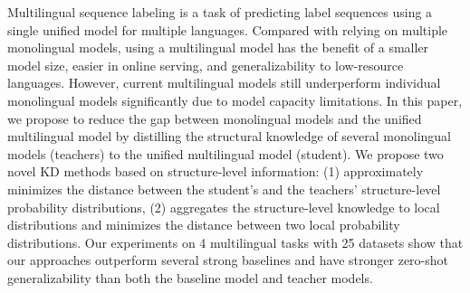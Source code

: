 Multilingual sequence labeling is a task of predicting label sequences using a single unified model for multiple languages. Compared with relying on multiple monolingual models, using a multilingual model has the benefit of a smaller model size, easier in online serving, and generalizability to low-resource languages. However, current multilingual models still underperform individual monolingual models significantly due to model capacity limitations. In this paper, we propose to reduce the gap between monolingual models and the unified multilingual model by distilling the structural knowledge of several monolingual models (teachers) to the unified multilingual model (student). We propose two novel KD methods based on structure-level information: (1) approximately minimizes the distance between the student's and the teachers' structure-level probability distributions, (2) aggregates the structure-level knowledge to local distributions and minimizes the distance between two local probability distributions. Our experiments on 4 multilingual tasks with 25 datasets show that our approaches outperform several strong baselines and have stronger zero-shot generalizability than both the baseline model and teacher models.
